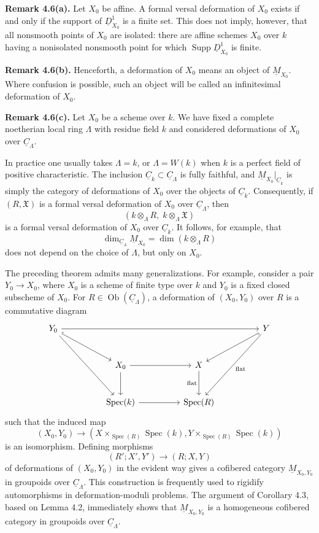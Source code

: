 
\medskip
\noindent\textbf{Remark 4.6(a).}
Let $X_0$ be affine. A formal versal deformation of $X_0$ exists if
and only if the support of $\underline D^1_{X_0}$ is a finite set.
This does not imply, however, that all nonsmooth points of $X_0$ are
isolated: there are affine schemes $X_0$ over $k$ having a
nonisolated nonsmooth point for which
$\operatorname{Supp}\underline D^1_{X_0}$ is finite.

\medskip
\noindent\textbf{Remark 4.6(b).}
Henceforth, a deformation of $X_0$ means an object of
$\underline M_{X_0}$. Where confusion is possible, such an object
will be called an infinitesimal deformation of $X_0$.

\medskip
\noindent\textbf{Remark 4.6(c).}
Let $X_0$ be a scheme over $k$. We have fixed a complete noetherian
local ring $\Lambda$ with residue field $k$ and considered
deformations of $X_0$ over $\underline C_\Lambda$.


In practice one usually takes $\Lambda=k$, or $\Lambda=W(k)$ when
$k$ is a perfect field of positive characteristic. The inclusion
$\underline C_k\subset\underline C_\Lambda$ is fully faithful, and
$\underline M_{X_0}|_{\underline C_k}$ is simply the category of
deformations of $X_0$ over the objects of $\underline C_k$.
Consequently, if $(R,\mathfrak X)$ is a formal versal deformation of
$X_0$ over $\underline C_\Lambda$, then
\[
 (k\otimes_\Lambda R,\;k\otimes_\Lambda\mathfrak X)
\]
is a formal versal deformation of $X_0$ over $\underline C_k$. It
follows, for example, that
\[
 \dim_{\underline C_\Lambda}\underline M_{X_0}
 =\dim(k\otimes_\Lambda R)
\]
does not depend on the choice of $\Lambda$, but only on $X_0$.

The preceding theorem admits many generalizations. For example,
consider a pair $Y_0\longrightarrow X_0$, where $X_0$ is a scheme of
finite type over $k$ and $Y_0$ is a fixed closed subscheme of $X_0$.
For $R\in\operatorname{Ob}(\underline C_\Lambda)$, a deformation of
$(X_0,Y_0)$ over $R$ is a commutative diagram
\[
\begin{tikzcd}[row sep=large,column sep=huge]
Y_0 \arrow[rrr] \arrow[dr,hook] \arrow[ddr]
&&& Y \arrow[dl,hook] \arrow[ddl,"\mathrm{flat}"] \\
& X_0 \arrow[r] \arrow[d]
& X \arrow[d,"\mathrm{flat}"'] & \\
& \operatorname{Spec}(k) \arrow[r]
& \operatorname{Spec}(R) &
\end{tikzcd}
\]
such that the induced map
\[
(X_0,Y_0)\longrightarrow
\left(
 X\times_{\operatorname{Spec}(R)}\operatorname{Spec}(k),
 Y\times_{\operatorname{Spec}(R)}\operatorname{Spec}(k)
\right)
\]
is an isomorphism. Defining morphisms
\[
(R';X',Y')\longrightarrow(R;X,Y)
\]
of deformations of $(X_0,Y_0)$ in the evident way gives a cofibered
category $\underline M_{X_0,Y_0}$ in groupoids over
$\underline C_\Lambda$. This construction is frequently used to
rigidify automorphisms in deformation-moduli problems. The argument
of Corollary 4.3, based on Lemma 4.2, immediately shows that
$\underline M_{X_0,Y_0}$ is a homogeneous cofibered category in
groupoids over $\underline C_\Lambda$.
